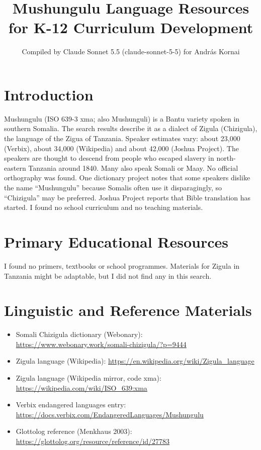 \documentclass[12pt]{article}
\title{Mushungulu Language Resources for K-12 Curriculum Development}
\author{Compiled by Claude Sonnet 5.5 (claude-sonnet-5-5) for Andr\'as Kornai}
\date{}
\begin{document}
\maketitle

\section{Introduction}
Mushungulu (ISO 639-3 xma; also Mushunguli) is a Bantu variety spoken in southern Somalia. The search results describe it as a dialect of Zigula (Chizigula), the language of the Zigua of Tanzania. Speaker estimates vary: about 23,000 (Verbix), about 34,000 (Wikipedia) and about 42,000 (Joshua Project). The speakers are thought to descend from people who escaped slavery in north-eastern Tanzania around 1840. Many also speak Somali or Maay. No official orthography was found. One dictionary project notes that some speakers dislike the name ``Mushungulu'' because Somalis often use it disparagingly, so ``Chizigula'' may be preferred. Joshua Project reports that Bible translation has started. I found no school curriculum and no teaching materials.

\section{Primary Educational Resources}
I found no primers, textbooks or school programmes. Materials for Zigula in Tanzania might be adaptable, but I did not find any in this search.

\section{Linguistic and Reference Materials}
\begin{itemize}
\item Somali Chizigula dictionary (Webonary): \url{https://www.webonary.work/somali-chizigula/?p=9444}
\item Zigula language (Wikipedia): \url{https://en.wikipedia.org/wiki/Zigula_language}
\item Zigula language (Wikipedia mirror, code xma): \url{https://wikipedia.com/wiki/ISO_639:xma}
\item Verbix endangered languages entry: \url{https://docs.verbix.com/EndangeredLanguages/Mushungulu}
\item Glottolog reference (Menkhaus 2003): \url{https://glottolog.org/resource/reference/id/27783}
\end{itemize}
\end{document}
